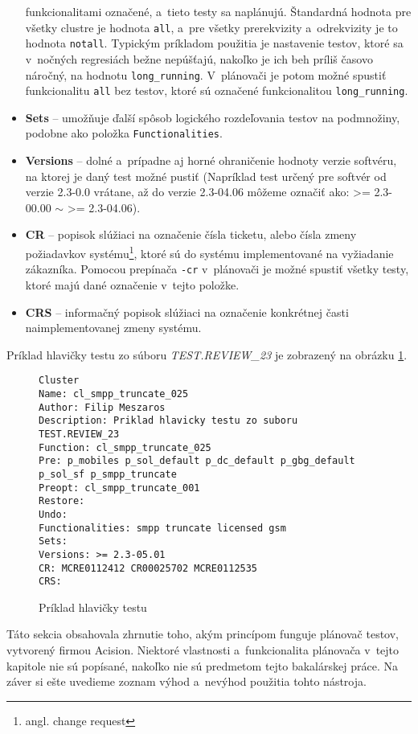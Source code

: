 \begin{itemize}
funkcionalitami označené, a~tieto testy sa naplánujú. 
Štandardná hodnota pre všetky clustre je hodnota \texttt{all}, a~pre 
všetky prerekvizity a~odrekvizity je to hodnota \texttt{notall}.
Typickým príkladom použitia je nastavenie testov, ktoré sa v~nočných 
regresiách bežne nepúšťajú, nakoľko je ich beh príliš časovo náročný, 
na hodnotu \texttt{long\_running}.
V~plánovači je potom možné spustiť funkcionalitu \texttt{all} bez testov, 
ktoré sú označené funkcionalitou \texttt{long\_running}.
\item \textbf{Sets} -- umožňuje ďalší spôsob logického rozdeľovania testov 
na podmnožiny, podobne ako položka \texttt{Functionalities}.
\item \textbf{Versions} -- dolné a~prípadne aj horné ohraničenie hodnoty 
verzie softvéru, na ktorej je daný test možné pustiť
(Napríklad test určený pre softvér od verzie 2.3-0.0 vrátane, 
až do verzie 2.3-04.06 môžeme označiť ako: \textgreater= 2.3-00.00 
$\sim$ \textgreater= 2.3-04.06).
\item \textbf{CR} -- popisok slúžiaci na označenie čísla ticketu, alebo 
čísla zmeny požiadavkov systému\footnote{angl. change request}, ktoré sú 
do systému implementované na vyžiadanie zákazníka. 
Pomocou prepínača \texttt{-cr} v~plánovači je možné spustiť všetky testy, 
ktoré majú dané označenie v~tejto položke.
\item \textbf{CRS} -- informačný popisok slúžiaci na označenie konkrétnej 
časti naimplementovanej zmeny systému. 
\end{itemize}

Príklad hlavičky testu zo súboru \emph{TEST.REVIEW\_23} je zobrazený na 
obrázku \ref{obrazok:hlavicka_testu}.

\begin{figure}[h]
\begin{lstlisting}
Cluster
Name: cl_smpp_truncate_025
Author: Filip Meszaros
Description: Priklad hlavicky testu zo suboru TEST.REVIEW_23
Function: cl_smpp_truncate_025
Pre: p_mobiles p_sol_default p_dc_default p_gbg_default p_sol_sf p_smpp_truncate
Preopt: cl_smpp_truncate_001
Restore:
Undo:
Functionalities: smpp truncate licensed gsm
Sets:
Versions: >= 2.3-05.01
CR: MCRE0112412 CR00025702 MCRE0112535
CRS:
\end{lstlisting}
\caption{Príklad hlavičky testu}
\label{obrazok:hlavicka_testu}
\end{figure}


Táto sekcia obsahovala zhrnutie toho, akým princípom funguje plánovač 
testov, vytvorený firmou Acision. Niektoré vlastnosti a~funkcionalita 
plánovača v~tejto kapitole nie sú popísané, nakoľko nie sú predmetom 
tejto bakalárskej práce. Na záver si ešte uvedieme zoznam výhod a~nevýhod 
použitia tohto nástroja.

